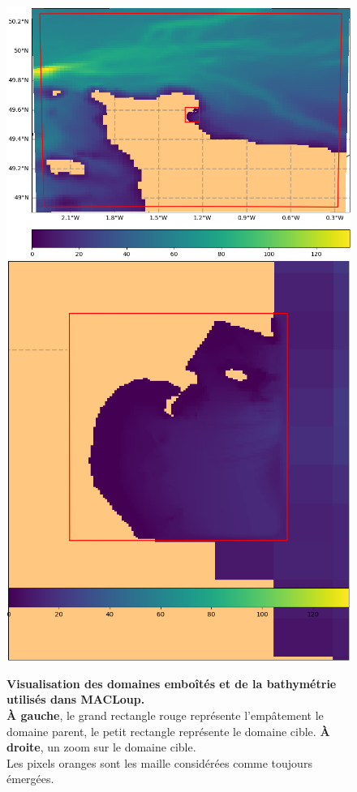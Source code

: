 \documentclass[10pt,a4paper,titlepage]{article}
\begin{document}
\begin{figure}[H]
    \centering
    \includegraphics[scale=0.4]{../images/COTENTIN_ADCL5.png}
    \includegraphics[scale=0.27]{../images/ADCL5.png}
    \caption{
        \textbf{Visualisation des domaines emboîtés et de la bathymétrie utilisés dans MACLoup.}\\
        \textbf{À gauche}, le grand rectangle rouge représente l'empâtement le domaine parent, le petit rectangle représente le domaine cible.
        \textbf{À droite}, un zoom sur le domaine cible.
        \\
        Les pixels oranges sont les maille considérées comme toujours émergées.
    }
    \label{fig:imbrication}
\end{figure}
\end{document}

